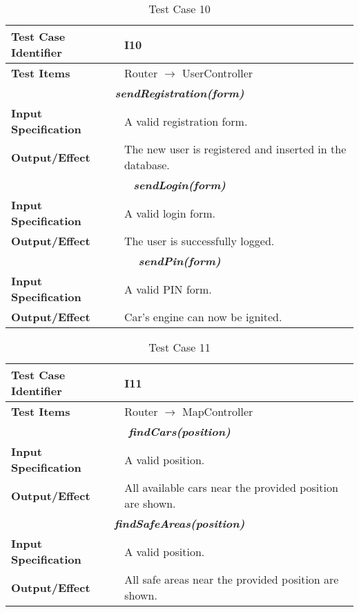 \begin{table}[h]
	\begin{tabularx}{\textwidth}{l X}
		\hline
		\textbf{Test Case Identifier}	&	I10\\	\hline
		\textbf{Test Items}			&	Router $\rightarrow$ UserController \\	\hline\hline
		\multicolumn{2}{c}{\textbf{\textit{sendRegistration(form)}}}	\\	\hline
			\textbf{Input Specification}	&	A valid registration form.\\	\hline
			\textbf{Output/Effect}	&	The new user is registered and inserted in the database.\\	\hline\hline
		\multicolumn{2}{c}{\textbf{\textit{sendLogin(form)}}}	\\	\hline
			\textbf{Input Specification}	&	A valid login form.\\	\hline
			\textbf{Output/Effect}	&	The user is successfully logged.\\	\hline\hline
		\multicolumn{2}{c}{\textbf{\textit{sendPin(form)}}}	\\	\hline
			\textbf{Input Specification}	&	A valid PIN form.\\	\hline
			\textbf{Output/Effect}	&	Car's engine can now be ignited.\\	\hline
	\end{tabularx}
	\captionsetup{textformat=empty,labelformat=blank}
	\caption{Test Case 10}
	\label{table:template-table-10}
\end{table}

\begin{table}[h]
	\begin{tabularx}{\textwidth}{l X}
		\hline
		\textbf{Test Case Identifier}	&	I11\\	\hline
		\textbf{Test Items}			&	Router $\rightarrow$ MapController \\	\hline\hline
		\multicolumn{2}{c}{\textbf{\textit{findCars(position)}}}	\\	\hline
			\textbf{Input Specification}	&	A valid position.\\	\hline
			\textbf{Output/Effect}	&	All available cars near the provided position are shown.\\	\hline\hline
		\multicolumn{2}{c}{\textbf{\textit{findSafeAreas(position)}}}	\\	\hline
			\textbf{Input Specification}	&	A valid position.\\	\hline
			\textbf{Output/Effect}	&	All safe areas near the provided position are shown.\\	\hline
	\end{tabularx}
	\captionsetup{textformat=empty,labelformat=blank}
	\caption{Test Case 11}
	\label{table:template-table-11}
\end{table}

